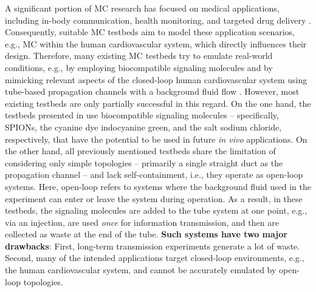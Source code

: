 A significant portion of \ac{MC} research has focused on medical applications, including in-body communication, health monitoring, and targeted drug delivery \cite{felicetti2016applications}. Consequently, suitable \ac{MC} testbeds aim to model these application scenarios, e.g., \ac{MC} within the human cardiovascular system, which directly influences their design. Therefore, many existing \ac{MC} testbeds \cite{bartunik2023development,lin2024testbed,wang2020understanding,wietfeld2024evaluation,angerbauer2023salinity,farsad2017novel,walter2023real} try to emulate real-world conditions, e.g., by employing biocompatible signaling molecules and by mimicking relevant aspects of the closed-loop human cardiovascular system using tube-based propagation channels with a background fluid flow \cite{Lotter2023testbedII}.
%
However, most existing testbeds are only partially successful in this regard. On the one hand, the testbeds presented in \cite{bartunik2023development,lin2024testbed,wang2020understanding} use biocompatible signaling molecules -- specifically, \acp{SPION}, the cyanine dye indocyanine green, and the salt sodium chloride, respectively, that have the potential to be used in future \textit{in vivo} applications. On the other hand, all previously mentioned testbeds \cite{bartunik2023development,lin2024testbed,wang2020understanding,wietfeld2024evaluation,angerbauer2023salinity,farsad2017novel,walter2023real} share the limitation of considering only simple topologies -- primarily a single straight duct as the propagation channel -- and lack self-containment, i.e., they operate as open-loop systems. Here, open-loop refers to systems where the background fluid used in the experiment can enter or leave the system during operation. As a result, in these testbeds, the signaling molecules are added to the tube system at one point, e.g., via an injection, are used \textit{once} for information transmission, and then are collected as waste at the end of the tube. \textbf{Such systems have two major drawbacks}: First, long-term transmission experiments generate a lot of waste. Second, many of the intended applications target closed-loop environments, e.g., the human cardiovascular system, and cannot be accurately emulated by open-loop topologies.

